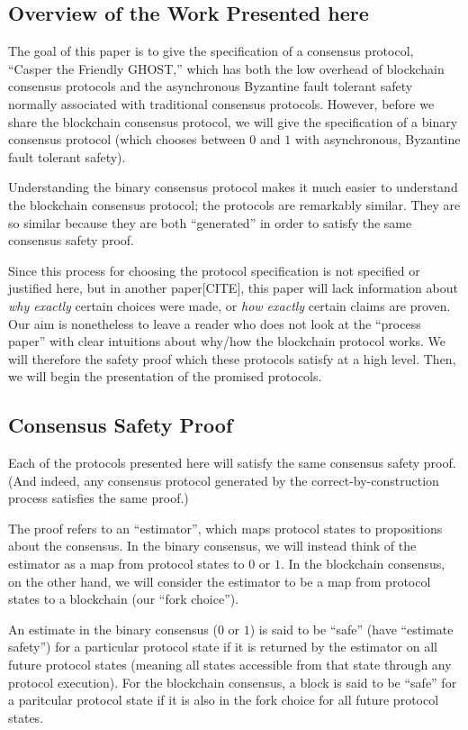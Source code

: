 \documentclass{article}
\theoremstyle{definition}
\begin{document}
\subsection{Overview of the Work Presented here}

The goal of this paper is to give the specification of a consensus protocol, ``Casper the Friendly GHOST,'' which has both the low overhead of blockchain consensus protocols and the asynchronous Byzantine fault tolerant safety normally associated with traditional consensus protocols. However, before we share the blockchain consensus protocol, we will give the specification of a binary consensus protocol (which chooses between $0$ and $1$ with asynchronous, Byzantine fault tolerant safety). 

Understanding the binary consensus protocol makes it much easier to understand the blockchain consensus protocol; the protocols are remarkably similar. They are so similar because they are both ``generated'' in order to satisfy the same consensus safety proof.

Since this process for choosing the protocol specification is not specified or justified here, but in another paper[CITE], this paper will lack information about \emph{why exactly} certain choices were made, or \emph{how exactly} certain claims are proven. Our aim is nonetheless to leave a reader who does not look at the ``process paper'' with clear intuitions about why/how the blockchain protocol works. We will therefore the safety proof which these protocols satisfy at a high level. Then, we will begin the presentation of the promised protocols.

\subsection{Consensus Safety Proof}

Each of the protocols presented here will satisfy the same consensus safety proof. (And indeed, any consensus protocol generated by the correct-by-construction process satisfies the same proof.) 

The proof refers to an ``estimator'', which maps protocol states to propositions about the consensus. In the binary consensus, we will instead think of the estimator as a map from protocol states to $0$ or $1$. In the blockchain consensus, on the other hand, we will consider the estimator to be a map from protocol states to a blockchain (our ``fork choice'').

An estimate in the binary consensus ($0$ or $1$) is said to be ``safe'' (have ``estimate safety'') for a particular protocol state if it is returned by the estimator on all future protocol states (meaning all states accessible from that state through any protocol execution). For the blockchain consensus, a block is said to be ``safe'' for a paritcular protocol state if it is also in the fork choice for all future protocol states.
\end{document}
